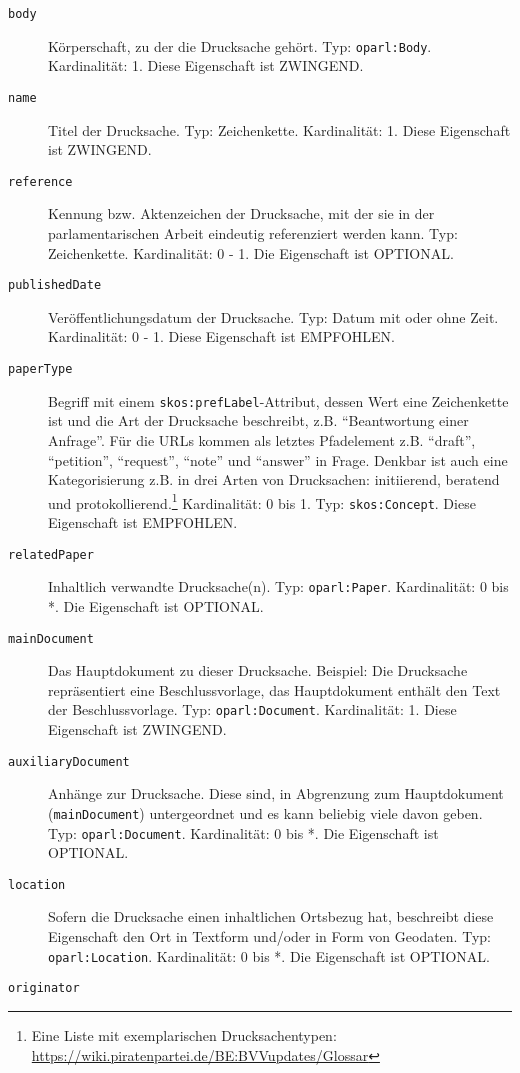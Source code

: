 \documentclass[,a4paper]{article}
\begin{document}
\begin{description}
\item[\texttt{body}]
Körperschaft, zu der die Drucksache gehört. Typ: \texttt{oparl:Body}.
Kardinalität: 1. Diese Eigenschaft ist ZWINGEND.
\item[\texttt{name}]
Titel der Drucksache. Typ: Zeichenkette. Kardinalität: 1. Diese
Eigenschaft ist ZWINGEND.
\item[\texttt{reference}]
Kennung bzw. Aktenzeichen der Drucksache, mit der sie in der
parlamentarischen Arbeit eindeutig referenziert werden kann. Typ:
Zeichenkette. Kardinalität: 0 - 1. Die Eigenschaft ist OPTIONAL.
\item[\texttt{publishedDate}]
Veröffentlichungsdatum der Drucksache. Typ: Datum mit oder ohne Zeit.
Kardinalität: 0 - 1. Diese Eigenschaft ist EMPFOHLEN.
\item[\texttt{paperType}]
Begriff mit einem \texttt{skos:prefLabel}-Attribut, dessen Wert eine
Zeichenkette ist und die Art der Drucksache beschreibt, z.B.
``Beantwortung einer Anfrage''. Für die URLs kommen als letztes
Pfadelement z.B. ``draft'', ``petition'', ``request'', ``note'' und
``answer'' in Frage. Denkbar ist auch eine Kategorisierung z.B. in drei
Arten von Drucksachen: initiierend, beratend und
protokollierend.\footnote{Eine Liste mit exemplarischen
  Drucksachentypen:
  \url{https://wiki.piratenpartei.de/BE:BVVupdates/Glossar}}
Kardinalität: 0 bis 1. Typ: \texttt{skos:Concept}. Diese Eigenschaft ist
EMPFOHLEN.
\item[\texttt{relatedPaper}]
Inhaltlich verwandte Drucksache(n). Typ: \texttt{oparl:Paper}.
Kardinalität: 0 bis *. Die Eigenschaft ist OPTIONAL.
\item[\texttt{mainDocument}]
Das Hauptdokument zu dieser Drucksache. Beispiel: Die Drucksache
repräsentiert eine Beschlussvorlage, das Hauptdokument enthält den Text
der Beschlussvorlage. Typ: \texttt{oparl:Document}. Kardinalität: 1.
Diese Eigenschaft ist ZWINGEND.
\item[\texttt{auxiliaryDocument}]
Anhänge zur Drucksache. Diese sind, in Abgrenzung zum Hauptdokument
(\texttt{mainDocument}) untergeordnet und es kann beliebig viele davon
geben. Typ: \texttt{oparl:Document}. Kardinalität: 0 bis *. Die
Eigenschaft ist OPTIONAL.
\item[\texttt{location}]
Sofern die Drucksache einen inhaltlichen Ortsbezug hat, beschreibt diese
Eigenschaft den Ort in Textform und/oder in Form von Geodaten. Typ:
\texttt{oparl:Location}. Kardinalität: 0 bis *. Die Eigenschaft ist
OPTIONAL.
\item[\texttt{originator}]

\end{description}
\end{document}
